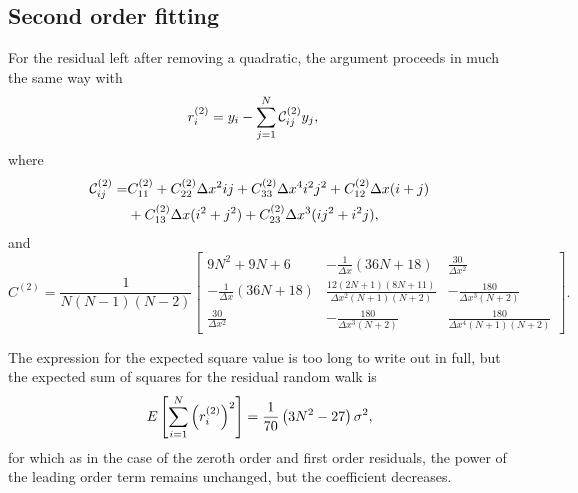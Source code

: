 \documentclass[../full_thesis/full_thesis.tex]{subfiles}
\begin{document}
\begin{subappendices}
\subsection{Second order fitting}
For the residual left after removing a quadratic, the  argument proceeds in much
the same way with
\begin{align}
r^{(2)}_{i} & = y_{i} - \sum_{j=1}^{N}\mathcal{C}_{ij}^{(2)} y_{j},
\end{align}
where
\begin{align}
\mathcal{C}_{ij}^{(2)}  = &C^{(2)}_{11} + C^{(2)}_{22}\Delta x^{2}ij +
C^{(2)}_{33}\Delta x^{4}i^{2}j^{2} \nonumber + C^{(2)}_{12}\Delta x(i+j) \nonumber \\
& + C^{(2)}_{13}\Delta x (i^{2} + j^2) + C^{(2)}_{23}\Delta x^{3}(ij^{2} + i^{2}j),
\label{eqn: MC_2}
\end{align}
and
\begin{equation}
C^{(2)} = \frac{1}{N(N-1)(N-2)}
\left[\begin{matrix}9 N^{2} + 9 N + 6 & - \frac{1}{\Delta{x}} \left(36 N + 18\right) & \frac{30}{\Delta{x}^{2}}\\- \frac{1}{\Delta{x}} \left(36 N + 18\right) & \frac{12 \left(2 N + 1\right) \left(8 N + 11\right)}{\Delta{x}^{2} \left(N + 1\right) \left(N + 2\right)} & - \frac{180}{\Delta{x}^{3} \left(N + 2\right)}\\\frac{30}{\Delta{x}^{2}} & - \frac{180}{\Delta{x}^{3} \left(N + 2\right)} & \frac{180}{\Delta{x}^{4} \left(N + 1\right) \left(N + 2\right)}\end{matrix}\right].
\label{eqn: C_2}
\end{equation}

The expression for the expected square value is too long to write out in full,
but the expected sum of squares for the residual random walk is
\begin{equation}
E\left[\sum_{i=1}^{N} \left(r^{(2)}_{i}\right)^{2}\right] =
 \frac{1}{70}\left(3N^{2} -27\right)\sigma^{2},
\label{eqn: sum of squares k2}
\end{equation}
for which as in the case of the zeroth order and first order residuals, the
power of the leading order term remains unchanged, but the coefficient
decreases.


\end{subappendices}
\end{document}
